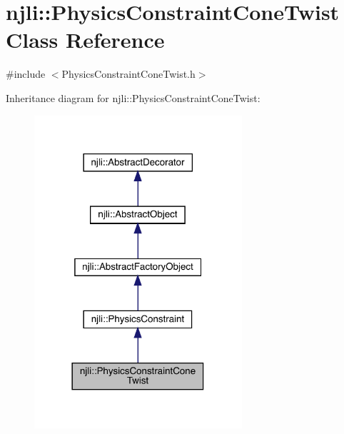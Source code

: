 \hypertarget{classnjli_1_1_physics_constraint_cone_twist}{}\section{njli\+:\+:Physics\+Constraint\+Cone\+Twist Class Reference}
\label{classnjli_1_1_physics_constraint_cone_twist}


{\ttfamily \#include $<$Physics\+Constraint\+Cone\+Twist.\+h$>$}



Inheritance diagram for njli\+:\+:Physics\+Constraint\+Cone\+Twist\+:\nopagebreak
\begin{figure}[H]
\begin{center}
\leavevmode
\includegraphics[width=218pt]{classnjli_1_1_physics_constraint_cone_twist__inherit__graph}
\end{center}
\end{figure}


